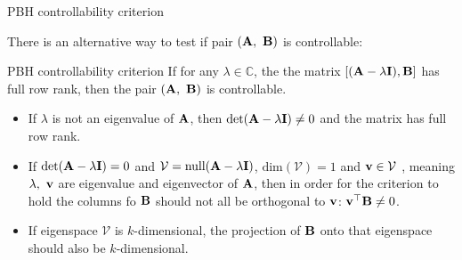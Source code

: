 \documentclass{beamer}
\begin{document}
\begin{frame}{PBH controllability criterion}
	\begin{flushleft}
		
		There is an alternative way to test if pair $(\mathbf{A}, \ \mathbf{B})$ is controllable:
		
		\begin{block}{PBH controllability criterion}
			If for any $\lambda \in \mathbb{C}$, the the matrix $[ (\mathbf{A}-\lambda\mathbf{I}), \mathbf{B}]$ has full row rank, then the pair $(\mathbf{A}, \ \mathbf{B})$ is controllable.
		\end{block}
		
		\begin{itemize}
			\item If $\lambda$ is not an eigenvalue of $\mathbf{A}$, then $\text{det}(\mathbf{A}-\lambda\mathbf{I}) \neq 0$ and the matrix has full row rank.
			
			\item If $\text{det}(\mathbf{A}-\lambda\mathbf{I}) = 0$ and $\mathcal{V} = \text{null}(\mathbf{A}-\lambda\mathbf{I})$, $\text{dim}(\mathcal{V}) = 1$ and $\mathbf{v} \in \mathcal{V}$ , meaning $\lambda, \ \mathbf{v}$ are eigenvalue and eigenvector of $\mathbf{A}$, then in order for the criterion to hold the columns fo $\mathbf{B}$ should not all be orthogonal to $\mathbf{v}$: $\mathbf{v}^\top \mathbf{B} \neq 0$.
			
			\item If eigenspace $\mathcal{V}$ is $k$-dimensional, the projection of $\mathbf{B}$ onto that eigenspace should also be $k$-dimensional.
			
		\end{itemize}
		
	\end{flushleft}
\end{frame}




\myqrframe


\begin{frame}
	
	
\end{frame}
\end{document}
